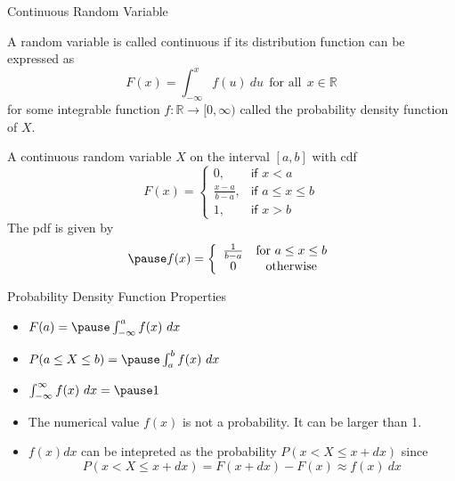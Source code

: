 \documentclass[t]{beamer}
\begin{document}
\begin{frame}{Continuous Random Variable}
  \footnotesize
  \begin{definition}
  \pause
    A random variable is called continuous if its distribution function can be expressed as
      \begin{equation*}
        F(x) = \int_{-\infty}^x f(u) \ du \ \ \text{for all} \ \ x \in \mathbb{R}
      \end{equation*}
    for some integrable function $f: \mathbb{R} \rightarrow [0,\infty)$ called the probability density function of $X$.
  \end{definition}
  \pause
  \begin{example}
    A continuous random variable $X$ on the interval $[a,b]$ with cdf 
    \pause
    \begin{equation*}
      F(x) = \left\{\begin{array}{ll}
                    0, & \textsf{if $x < a$} \\
                    \frac{x-a}{b-a}, & \textsf{if $a \leq x \leq b$} \\
                    1, & \textsf{if $x > b$}
                   \end{array}
            \right.
    \end{equation*}
    \pause The pdf is given by
    \begin{equation*}
      \pause f(x) = \left\{
                      \begin{array}{cc}
                        \frac{1}{b-a} & \text{for } a \leq x \leq b \\
                        0 & \text{otherwise}
                      \end{array}
                    \right.
    \end{equation*}
  \end{example}
  \normalsize
\end{frame}

\begin{frame}{Probability Density Function Properties}
  \footnotesize
  \begin{itemize}
    \item \pause $F(a) = \pause \int_{-\infty}^{a} f(x) \ dx$
    \item \pause $P(a \leq X \leq b) =\pause  \int_{a}^{b}f(x) \ dx$
    \item \pause $\int_{-\infty}^{\infty} f(x)\ dx =\pause  1$
    \item \pause The numerical value $f(x)$ is not a probability. It can be larger than 1.
    \item \pause $f(x)dx$ can be intepreted as the probability $P(x < X \leq x + dx)$ \pause since
    \begin{equation*}
      P(x < X \leq x + dx) = F(x + dx) - F(x) \approx f(x) \ dx
    \end{equation*}
  \end{itemize}
  \normalsize
\end{frame}
\end{document}
